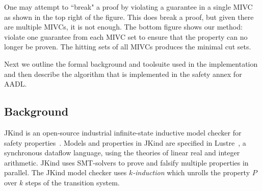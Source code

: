 One may attempt to ``break" a proof by violating a guarantee in a single MIVC as shown in the top right of the figure. This does break a proof, but given there are multiple MIVCs, it is not enough. The bottom figure shows our method: violate one guarantee from each MIVC set to ensure that the property can no longer be proven. The hitting sets of all MIVCs produces the minimal cut sets. 

Next we outline the formal background and toolsuite used in the implementation and then describe the algorithm that is implemented in the safety annex for AADL. 

\subsection{Background}
JKind is an open-source industrial infinite-state inductive model checker for safety properties~\cite{2017arXiv171201222G}. Models and properties in JKind are specified in Lustre~\cite{Halbwachs91:IEEE}, a synchronous dataflow language, using the theories of linear real and integer arithmetic. JKind uses SMT-solvers to prove and falsify multiple properties in parallel. The JKind model checker uses {\em
  $k$-induction} which unrolls the property $P$ over $k$ steps of the
transition system.

